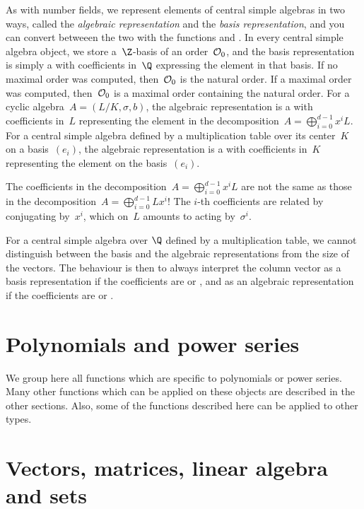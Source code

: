 \par As with number fields, we represent elements of central simple algebras
in two ways, called the \emph{algebraic representation} and the \emph{basis
representation}, and you can convert betweeen the two with the functions
 and . In every central simple algebra
object, we store a~$\Z$-basis of an order~${\cal O}_0$, and the basis
representation is simply a  with coefficients in~$\Q$ expressing the
element in that basis. If no maximal order was computed, then~${\cal O}_0$ is
the natural order. If a maximal order was computed, then~${\cal O}_0$ is a
maximal order containing the natural order. For a cyclic algebra~$A =
(L/K,\sigma,b)$, the algebraic representation is a  with coefficients
in~$L$ representing the element in the decomposition~$A =
\bigoplus_{i=0}^{d-1}x^iL$. For a central simple algebra defined by a
multiplication table over its center~$K$ on a basis~$(e_i)$, the algebraic
representation is a  with coefficients in~$K$ representing the element
on the basis~$(e_i)$.

 The coefficients in the decomposition~$A =
\bigoplus_{i=0}^{d-1}x^iL$ are not the same as those in the decomposition~$A
= \bigoplus_{i=0}^{d-1}Lx^i$! The $i$-th coefficients are related by
conjugating by~$x^i$, which on~$L$ amounts to acting by~$\sigma^i$.

 For a central simple algebra over $\Q$ defined by a
multiplication table, we cannot distinguish between the basis and the algebraic
representations from the size of the vectors. The behaviour is then to always
interpret the column vector as a basis representation if the coefficients are
 or , and as an algebraic representation if the coefficients
are  or .


\section{Polynomials and power series}

We group here all functions which are specific to polynomials or power
series. Many other functions which can be applied on these objects are
described in the other sections. Also, some of the functions described here
can be applied to other types.


\section{Vectors, matrices, linear algebra and sets}
\label{se:linear_algebra}

